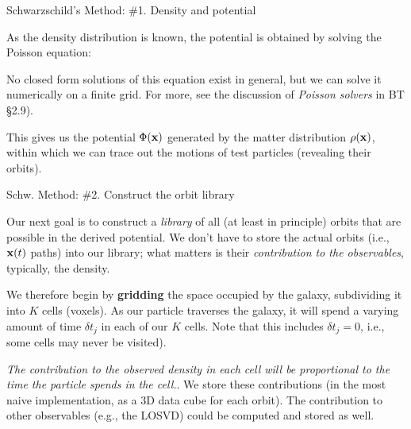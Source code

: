 \documentclass[letterpaper,landscape]{slides}
\begin{document}
\begin{slide}
\begin{center}
{\large \color{red} 
                  Schwarzschild's Method: \#1. Density and potential  }
\end{center}

As the density distribution is known, the potential is obtained by solving
the Poisson equation:


No closed form solutions of this equation exist in general, but we can solve
it numerically on a finite grid.  For more, see the discussion of {\em
Poisson solvers} in BT \S2.9).

This gives us the potential $\Phi({\bf x})$ generated by the matter distribution
$\rho({\bf x})$, within which we can trace out the motions of test particles
(revealing their orbits).

\vfill
\end{slide}

\begin{slide}
\begin{center}
{\large \color{red} 
                  Schw. Method: \#2. Construct the orbit library  }
\end{center}

Our next goal is to construct a {\em library} of all (at least in principle)
orbits that are possible in the derived potential.  We don't have to store
the actual orbits (i.e., ${\bf x}(t)$ paths) into our library; what matters is
their {\em contribution to the observables}, typically, the density.

We therefore begin by {\bf gridding} the space occupied by the galaxy,
subdividing it into $K$ cells (voxels).  As our particle traverses the galaxy,
it will spend a varying amount of time $\delta t_j$ in each of our $K$
cells. Note that this includes $\delta t_j = 0$, i.e., some cells may never
be visited).

{\em The contribution to the observed density in each cell will be
proportional to the time the particle spends in the cell.}. We store these
contributions (in the most naive implementation, as a 3D data cube for each
orbit). The contribution to other observables (e.g., the LOSVD) could be
computed and stored as well.

\vfill
\end{slide}
\end{document}
